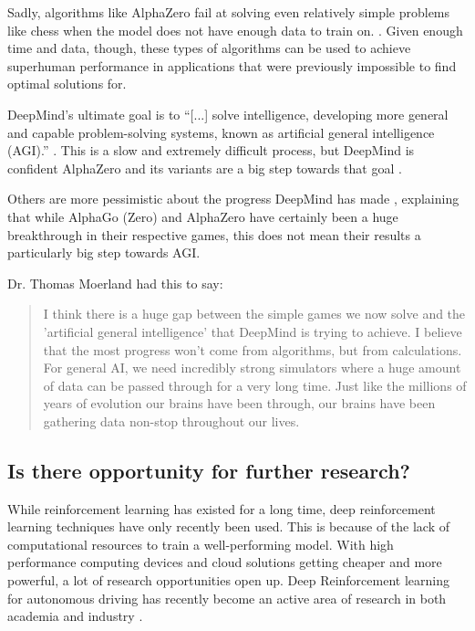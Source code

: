 \documentclass{article}
\begin{document}
Sadly, algorithms like AlphaZero fail at solving even relatively simple problems like chess when the model 
does not have enough data to train on.  \cite{ThomasMoerlandPostdoc}. 
Given enough time and data, though, these types of algorithms can be used to achieve superhuman
performance in applications that were previously impossible to find optimal solutions for.

DeepMind's ultimate goal is to ``[...] solve intelligence, developing more general and capable 
problem-solving systems, known as artificial general intelligence (AGI).'' \cite{DeepMind}.
This is a slow and extremely difficult process, but DeepMind is confident AlphaZero and 
its variants are a big step towards that goal \cite{AlphaZeroSheddingNew}.

Others are more pessimistic about the progress DeepMind has made \cite{moerlandEmailExchangeTuur22, dukezhouAnswerAlphaZeroExample2018},
explaining that while AlphaGo (Zero) and AlphaZero have certainly been a huge breakthrough in their respective games, 
this does not mean their results a particularly big step towards AGI. 

Dr. Thomas Moerland had this to say:

\begin{quotation}
    I think there is a huge gap between the simple games we now solve and the 
    'artificial general intelligence' that DeepMind is trying to achieve.
    I believe that the most progress won't come from algorithms, but from calculations.
    For general AI, we need incredibly strong simulators where a huge amount of data
    can be passed through for a very long time. 
    Just like the millions of years of evolution our brains have been through, our brains
    have been gathering data non-stop throughout our lives. \cite{moerlandEmailExchangeTuur22}
\end{quotation}



\subsection{Is there opportunity for further research?}

While reinforcement learning has existed for a long time, deep reinforcement learning techniques 
have only recently been used. This is because of the lack of computational resources to train
a well-performing model. With high performance computing devices and cloud solutions getting cheaper
and more powerful, a lot of research opportunities open up.
Deep Reinforcement learning for autonomous driving has recently become an active area of research 
in both academia and industry \cite{DeepReinforcementLearning2022a}.
\end{document}
